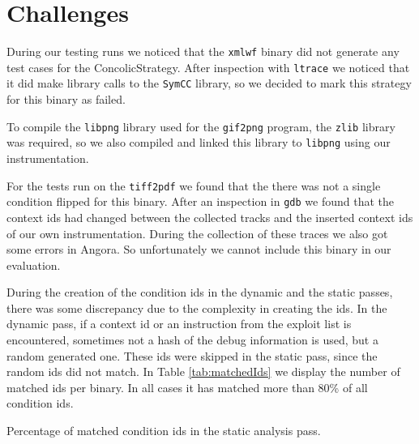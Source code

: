 \section{Challenges}
During our testing runs we noticed that the \texttt{xmlwf} binary did not generate any test cases for the ConcolicStrategy. After inspection with \texttt{ltrace} we noticed that it did make library calls to the \texttt{SymCC} library, so we decided to mark this strategy for this binary as failed.

To compile the \texttt{libpng} library used for the \texttt{gif2png} program, the \texttt{zlib} library was required, so we also compiled and linked this library to \texttt{libpng} using our instrumentation. 

For the tests run on the \texttt{tiff2pdf} we found that the there was not a single condition flipped for this binary. After an inspection in \texttt{gdb} we found that the context ids had changed between the collected tracks and the inserted context ids of our own instrumentation. During the collection of these traces we also got some errors in Angora. So unfortunately we cannot include this binary in our evaluation. %

During the creation of the condition ids in the dynamic and the static passes, there was some discrepancy due to the complexity in creating the ids. In the dynamic pass, if a context id or an instruction from the exploit list is encountered, sometimes not a hash of the debug information is used, but a random generated one. These ids were skipped in the static pass, since the random ids did not match. In Table \ref{tab:matchedIds} we display the number of matched ids per binary. In all cases it has matched more than 80\% of all condition ids.
\begin{table}[H]
\centering

\caption{Percentage of matched condition ids in the static analysis pass.}\label{tab:matchedIds}
\end{table}
